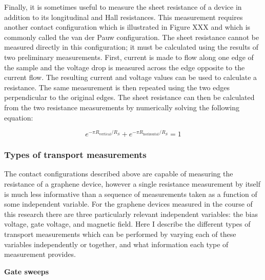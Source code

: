 \documentclass[edeposit,fullpage,draftthesis]{uiucthesis2009}
\begin{document}
            Finally, it is sometimes useful to measure the sheet resistance of a device in addition to 
            its longitudinal and Hall resistances.
            This measurement requires another contact configuration which is illustrated in Figure XXX
            and which is commonly called the van der Pauw configuration\cite{van1958method}.
            The sheet resistance cannot be measured directly in this configuration; it must be calculated
            using the results of two preliminary measurements. First, current is made to flow along one
            edge of the sample and the voltage drop is measured across the edge opposite to the current flow.
            The resulting current and voltage values can be used to calculate a resistance.
            The same measurement is then repeated using the two edges perpendicular to the original edges.
            The sheet resistance can then be calculated from the two resistance measurements by numerically
            solving the following equation:
            
            \begin{equation}
                e^{-\pi R_{\text{vertical}}/R_S}+e^{-\pi R_{\text{horizontal}}/R_S}=1
            \end{equation}
           
        \subsubsection*{Types of transport measurements}
        
            The contact configurations described above are capable of measuring the resistance of a graphene
            device, however a single resistance measurement by itself is much less informative than
            a sequence of measurements taken as a function of some independent variable. For the graphene
            devices measured in the course of this research there are three particularly relevant
            independent variables: the bias voltage, gate voltage, and magnetic field.
            Here I describe the different types of transport measurements which can be performed by 
            varying each of these variables independently or together, and what information each
            type of measurement provides.
            
            \textbf{Gate sweeps}
            
\end{document}
